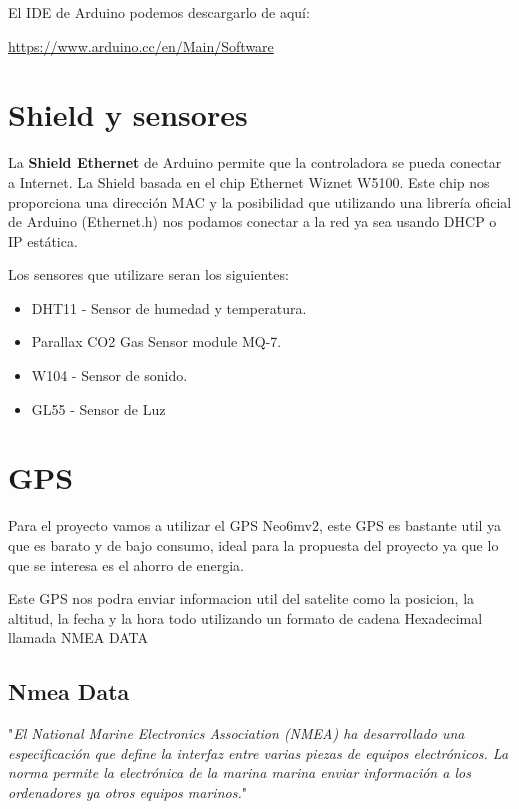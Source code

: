  El IDE de Arduino podemos descargarlo de aquí:
 
 \url{https://www.arduino.cc/en/Main/Software}
 
\section{Shield y sensores}

La \textbf{Shield Ethernet} de Arduino permite que la controladora se pueda conectar a Internet. La Shield basada en el chip Ethernet Wiznet W5100. Este chip nos proporciona una dirección MAC y la posibilidad que utilizando una librería oficial de Arduino (Ethernet.h) nos podamos conectar a la red ya sea usando DHCP o IP estática.

Los sensores que utilizare seran los siguientes:

	\begin{itemize}
		\item DHT11 - Sensor de humedad y temperatura.
		\item Parallax CO2 Gas Sensor module MQ-7.
		\item W104 - Sensor de sonido.
		\item GL55 - Sensor de Luz
		
	\end{itemize}



\section{GPS}

Para el proyecto vamos a utilizar el GPS Neo6mv2, este GPS es bastante util ya que es barato y de bajo consumo, ideal para la propuesta del proyecto ya que lo que se interesa es el ahorro de energia.

Este GPS nos podra enviar informacion util del satelite como la posicion, la altitud, la fecha y la hora todo utilizando un formato de cadena Hexadecimal llamada NMEA DATA

 \subsection{Nmea Data}
 
 "\textit{El National Marine Electronics Association (NMEA) ha desarrollado una especificación que define la interfaz entre varias piezas de equipos electrónicos. La norma permite la electrónica de la marina marina enviar información a los ordenadores ya otros equipos marinos.}"
 
